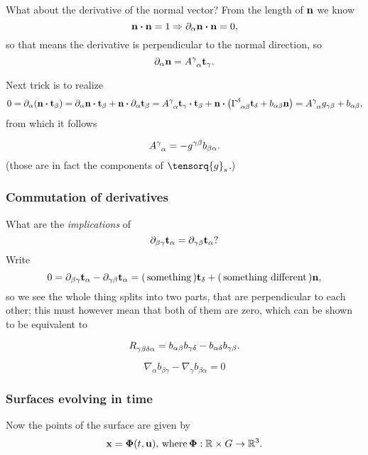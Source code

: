 \documentclass[../main.tex]{subfiles}
\begin{document}
What about the derivative of the normal vector? From the length of $\vb{n}$ we know
\[
	\vb{n}\vdot \vb{n} = 1 \Rightarrow \partial_{\alpha} \vb{n}\vdot \vb{n} = 0,
\]
so that means the derivative is perpendicular to the normal direction, so
\[
	\partial_{\alpha}\vb{n}= A \indices{^\gamma_{\alpha}} \vb{t}_{\gamma}.
\]

Next trick is to realize
\[
	0 = \partial_{\alpha}\qty(\vb{n}\vdot \vb{t}_{\beta}) = \partial_{\alpha}\vb{n} \vdot \vb{t}_{\beta}+ \vb{n}\vdot \partial_{\alpha}\vb{t}_{\beta}= A \indices{^{\gamma}_{\alpha}}\vb{t}_{\gamma} \vdot \vb{t}_{\beta}+ \vb{n}\vdot \qty(\Gamma \indices{^{\delta}_{\alpha \beta}} \vb{t}_{\delta}+b_{\alpha \beta} \vb{n}) = A \indices{^\gamma _{\alpha}} g_{\gamma \beta}+ b_{\alpha \beta},
\]
from which it follows

\[
	A \indices{^{\gamma}_{\alpha}} = -g \indices{^{\gamma \beta}}b_{\beta \alpha}.
\]
(those are in fact the components of $\tensorq{g}_s$.)

\subsubsection{Commutation of derivatives}
\label{sec:com_der}

What are the \textit{implications} of
\[
	\partial_{\beta \gamma}\vb{t}_{\alpha} = \partial_{\gamma \beta}\vb{t}_{\alpha}?
\]
Write
\[
	0 =\partial_{\beta \gamma}\vb{t}_{\alpha} - \partial_{\gamma \beta}\vb{t}_{\alpha} = (\, \text{something} \,) \vb{t}_{\delta}+(\, \text{something different} \,) \vb{n},
\]
so we see the whole thing splits into two parts, that are perpendicular to each other; this must however mean that both of them are zero, which can be shown to be equivalent to 
\begin{theorem}
	\[
		R \indices{_{\gamma \beta \delta \alpha}} = b_{\alpha \beta}b_{\gamma \delta} - b_{\alpha \delta} b_{\gamma \beta}.
	\]
\end{theorem}

\begin{theorem}
	\[
		\nabla_{\alpha}b_{\beta \gamma}- \nabla_{\gamma}b_{\beta \alpha}=0
	\]
\end{theorem}

\subsubsection{Surfaces evolving in time}
\label{sec:time_evolving_surfaces}

Now the points of the surface are given by
\[
	\vb{x}=\vb*{\Phi}\qty(t,\vb{u}), \, \text{where} \,\vb*{\Phi}: {\mathbb R} \times G \to {\mathbb R}^3.
\]
\end{document}
